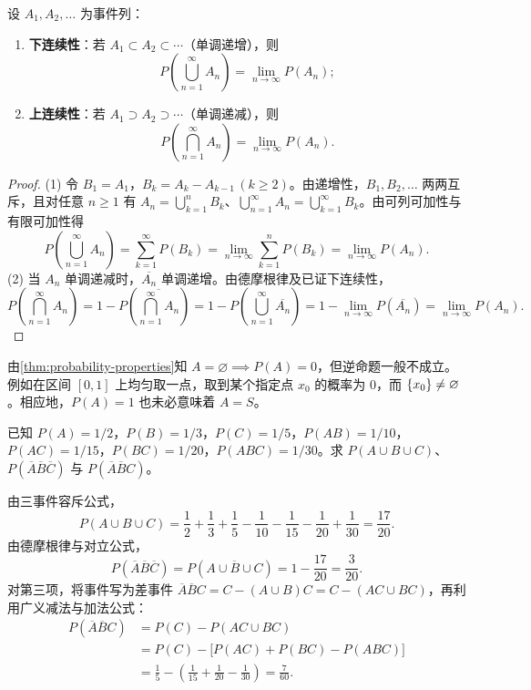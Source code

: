 \begin{theorem}[概率对单调事件列的连续性]
\label{thm:probability-continuity}
设 $A_1,A_2,\ldots$ 为事件列：
\begin{enumerate}
  \item \textbf{下连续性}：若 $A_1\subset A_2\subset\cdots$（单调递增），则
  \[
    P\left(\bigcup_{n=1}^{\infty}A_n\right)=\lim_{n\to\infty}P(A_n);
  \]
  \item \textbf{上连续性}：若 $A_1\supset A_2\supset\cdots$（单调递减），则
  \[
    P\left(\bigcap_{n=1}^{\infty}A_n\right)=\lim_{n\to\infty}P(A_n).
  \]
\end{enumerate}
\end{theorem}
\begin{proof}
(1) 令 $B_1=A_1$，$B_k=A_k-A_{k-1}\,(k\ge 2)$。由递增性，$B_1,B_2,\ldots$ 两两互斥，且对任意 $n\ge 1$ 有 $A_n=\bigcup_{k=1}^{n}B_k$、$\bigcup_{n=1}^{\infty}A_n=\bigcup_{k=1}^{\infty}B_k$。由可列可加性与有限可加性得
\[
  P\left(\bigcup_{n=1}^{\infty}A_n\right)
  =\sum_{k=1}^{\infty}P(B_k)
  =\lim_{n\to\infty}\sum_{k=1}^{n}P(B_k)
  =\lim_{n\to\infty}P(A_n).
\]
(2) 当 $A_n$ 单调递减时，$\overline{A_n}$ 单调递增。由德摩根律及已证下连续性，
\[
  P\left(\bigcap_{n=1}^{\infty}A_n\right)
  =1-P\left(\overline{\bigcap_{n=1}^{\infty}A_n}\right)
  =1-P\left(\bigcup_{n=1}^{\infty}\overline{A_n}\right)
  =1-\lim_{n\to\infty}P(\overline{A_n})
  =\lim_{n\to\infty}P(A_n).
\]
\end{proof}

\begin{remark}[零概率事件与不可能事件]
由\cref{thm:probability-properties}知 $A=\varnothing\implies P(A)=0$，但逆命题一般不成立。例如在区间 $[0,1]$ 上均匀取一点，取到某个指定点 $x_0$ 的概率为 $0$，而 $\{x_0\}\ne\varnothing$。相应地，$P(A)=1$ 也未必意味着 $A=S$。
\end{remark}

\begin{example}[title={利用概率运算性质求复合事件概率}]
\label{eg:prob-algebra}
已知 $P(A)=1/2$，$P(B)=1/3$，$P(C)=1/5$，$P(AB)=1/10$，$P(AC)=1/15$，$P(BC)=1/20$，$P(ABC)=1/30$。求 $P(A\cup B\cup C)$、$P(\overline{A}\overline{B}\overline{C})$ 与 $P(\overline{A}\overline{B}C)$。
\begin{solution}
由三事件容斥公式，
\[
  P(A\cup B\cup C)
  =\frac{1}{2}+\frac{1}{3}+\frac{1}{5}-\frac{1}{10}-\frac{1}{15}-\frac{1}{20}+\frac{1}{30}
  =\frac{17}{20}.
\]
由德摩根律与对立公式，
\[
  P(\overline{A}\overline{B}\overline{C})
  =P(\overline{A\cup B\cup C})
  =1-\frac{17}{20}=\frac{3}{20}.
\]
对第三项，将事件写为差事件 $\overline{A}\overline{B}C=C-(A\cup B)C=C-(AC\cup BC)$，再利用广义减法与加法公式：
\[
\begin{aligned}
  P(\overline{A}\overline{B}C)
  &=P(C)-P(AC\cup BC)\\
  &=P(C)-\bigl[P(AC)+P(BC)-P(ABC)\bigr]\\
  &=\frac{1}{5}-\left(\frac{1}{15}+\frac{1}{20}-\frac{1}{30}\right)
  =\frac{7}{60}.
\end{aligned}
\]
\end{solution}
\end{example}

